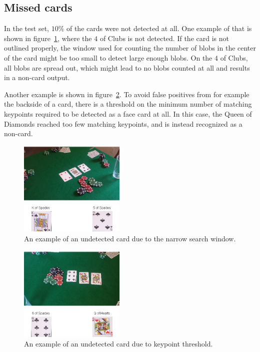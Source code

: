 \documentclass[journal,twoside]{IEEEtran}
\begin{document}
\subsection{Missed cards}

In the test set, $10\%$ of the cards were not detected at all. One example of that is shown in figure~\ref{fig:error11}, where the $4$ of Clubs is not detected. If the card is not outlined properly, the window used for counting the number of blobs in the center of the card might be too small to detect large enough blobs. On the $4$ of Clubs, all blobs are spread out, which might lead to no blobs counted at all and results in a non-card output.

Another example is shown in figure~\ref{fig:error17}. To avoid false positives from for example the backside of a card, there is a threshold on the minimum number of matching keypoints required to be detected as a face card at all. In this case, the Queen of Diamonds reached too few matching keypoints, and is instead recognized as a non-card.

\begin{figure}[placement h]
\centering
\includegraphics[width=0.45\textwidth]{images/testResults/11.png}
\caption{An example of an undetected card due to the narrow search window.}
\label{fig:error11}
\end{figure}

\begin{figure}[placement h]
\centering
\includegraphics[width=0.45\textwidth]{images/testResults/17.png}
\caption{An example of an undetected card due to keypoint threshold.}
\label{fig:error17}
\end{figure}
\end{document}
